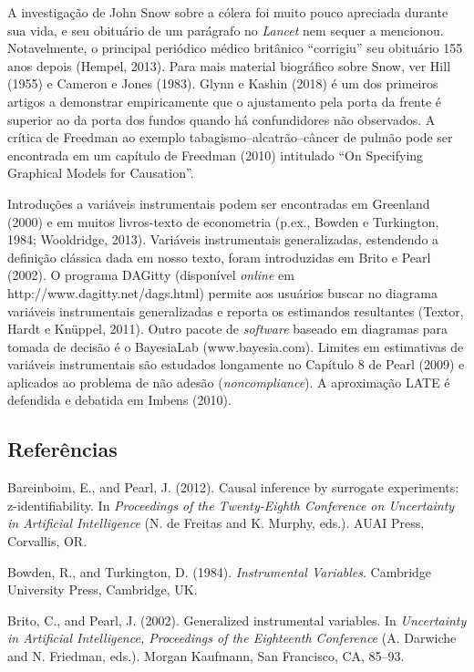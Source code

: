 \documentclass[11pt,a5paper,twoside]{book}
\begin{document}
A investigação de John Snow sobre a cólera foi muito pouco apreciada durante sua vida, e seu obituário de um parágrafo no \textit{Lancet} nem sequer a mencionou. Notavelmente, o principal periódico médico britânico “corrigiu” seu obituário 155 anos depois (Hempel, 2013). Para mais material biográfico sobre Snow, ver Hill (1955) e Cameron e Jones (1983). Glynn e Kashin (2018) é um dos primeiros artigos a demonstrar empiricamente que o ajustamento pela porta da frente é superior ao da porta dos fundos quando há confundidores não observados. A crítica de Freedman ao exemplo tabagismo–alcatrão–câncer de pulmão pode ser encontrada em um capítulo de Freedman (2010) intitulado “On Specifying Graphical Models for Causation”.

Introduções a variáveis instrumentais podem ser encontradas em Greenland (2000) e em muitos livros-texto de econometria (p.ex., Bowden e Turkington, 1984; Wooldridge, 2013). Variáveis instrumentais generalizadas, estendendo a definição clássica dada em nosso texto, foram introduzidas em Brito e Pearl (2002). O programa DAGitty (disponível \textit{online} em http://www.dagitty.net/dags.html) permite aos usuários buscar no diagrama variáveis instrumentais generalizadas e reporta os estimandos resultantes (Textor, Hardt e Knüppel, 2011). Outro pacote de \textit{software} baseado em diagramas para tomada de decisão é o BayesiaLab (www.bayesia.com). Limites em estimativas de variáveis instrumentais são estudados longamente no Capítulo 8 de Pearl (2009) e aplicados ao problema de não adesão (\textit{noncompliance}). A aproximação LATE é defendida e debatida em Imbens (2010).

\subsection{Referências}
Bareinboim, E., and Pearl, J. (2012). Causal inference by surrogate experiments: z-identifiability. In \textit{Proceedings of the Twenty-Eighth Conference on Uncertainty in Artificial Intelligence} (N. de Freitas and K. Murphy, eds.). AUAI Press, Corvallis, OR.

Bowden, R., and Turkington, D. (1984). \textit{Instrumental Variables}. Cambridge University Press, Cambridge, UK.

Brito, C., and Pearl, J. (2002). Generalized instrumental variables. In \textit{Uncertainty in Artificial Intelligence, Proceedings of the Eighteenth Conference} (A. Darwiche and N. Friedman, eds.). Morgan Kaufmann, San Francisco, CA, 85–93.
\end{document}

